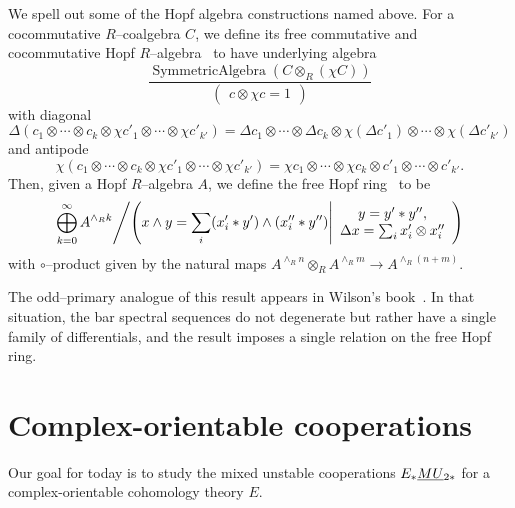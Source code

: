 \begin{definition}
We spell out some of the Hopf algebra constructions named above.  For a cocommutative $R$--coalgebra $C$, we define its free commutative and cocommutative Hopf $R$--algebra~\cite{Takeuchi} to have underlying algebra \[\frac{\operatorname{SymmetricAlgebra} \left(C \otimes_R (\chi C)\right)}{\left( \begin{array}{c} c \otimes \chi c = 1 \end{array} \right)}\] with diagonal \[\Delta(c_1 \otimes \cdots \otimes c_k \otimes \chi c'_1 \otimes \cdots \otimes \chi c'_{k'}) = \Delta c_1 \otimes \cdots \otimes \Delta c_k \otimes \chi (\Delta c'_1) \otimes \cdots \otimes \chi(\Delta c'_{k'})\] and antipode \[\chi(c_1 \otimes \cdots \otimes c_k \otimes \chi c'_1 \otimes \cdots \otimes \chi c'_{k'}) = \chi c_1 \otimes \cdots \otimes \chi c_k \otimes c'_1 \otimes \cdots \otimes c'_{k'}.\]  Then, given a Hopf $R$--algebra $A$, we define the free Hopf ring~\cite[Definition 4.2, Proposition 2.16]{HuntonTurner} to be \[\left. \bigoplus_{k=0}^\infty A^{\wedge_R k} \middle/ \left(x \wedge y = \sum_i (x'_i \ast y') \wedge (x''_i \ast y'') \middle| \begin{array}{c} y = y' \ast y'', \\ \Delta x = \sum_i x'_i \otimes x''_i \end{array} \right) \right.\] with $\circ$--product given by the natural maps $A^{\wedge_R n} \otimes_R A^{\wedge_R m} \to A^{\wedge_R (n+m)}$.
\end{definition}

\begin{remark}
The odd--primary analogue of this result appears in Wilson's book~\cite[Theorem 8.5]{Wilson}.  In that situation, the bar spectral sequences do not degenerate but rather have a single family of differentials, and the result imposes a single relation on the free Hopf ring.
\end{remark}











\section{Complex-orientable cooperations}

Our goal for today is to study the mixed unstable cooperations $E_* \smash{\underline{MU}}_{2*}$ for a complex-orientable cohomology theory $E$.

